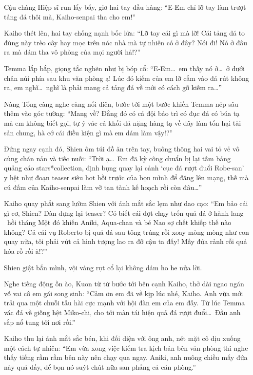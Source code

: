 \documentclass[../main.tex]{subfiles}
\begin{document}
Cậu chàng Hiệp sĩ run lẩy bẩy, giơ hai tay đầu hàng: ``E-Em chỉ lỡ tay làm trượt tảng đá thôi mà, Kaiho-senpai tha cho em!''

Kaiho thét lên, hai tay chống nạnh bốc lửa: ``Lỡ tay cái gì mà lỡ! Cái tảng đá to đùng này trèo cây hay mọc trên nóc nhà mà tự nhiên có ở đây? Nói đi! Nó ở đâu ra mà dám tha vô phòng của mọi người hả!?''

Temma lắp bắp, giọng tắc nghẽn như bị bóp cổ: ``E-Em\dots\ em thấy nó ở\dots\ ở dưới chân núi phía sau khu văn phòng ạ! Lúc đó kiếm của em lỡ cắm vào đá rút không ra, em nghĩ\dots\ nghĩ là phải mang cả tảng đá về mới có cách gỡ kiếm ra\dots''

Nàng Tổng càng nghe càng nổi điên, bước tới một bước khiến Temma nép sâu thêm vào góc tường: ``Mang về? Đằng đó có cả đội bảo trì có đục đá có búa tạ mà em không biết gọi, tự ý vác cả khối đá nặng hàng tạ về đây làm tổn hại tài sản chung, hà cớ cái điều kiện gì mà em dám làm vậy!?''

Đứng ngay cạnh đó, Shien ôm túi đồ ăn trên tay, buông thõng hai vai tỏ vẻ vô cùng chán nản và tiếc nuối: ``Trời ạ\dots\ Em đã kỳ công chuẩn bị lại tấm bảng quảng cáo stars*collection, định bụng quay lại cảnh `cục đá rượt đuổi Robe-san' y hệt như đoạn teaser siêu hot hồi trước của bọn mình để đăng lên mạng, thế mà cú đấm của Kaiho-senpai làm vỡ tan tành kế hoạch rồi còn đâu\dots''

Kaiho quay phắt sang lườm Shien với ánh mắt sắc lẹm như dao cạo: ``Em bảo cái gì cơ, Shien? Dàn dựng lại teaser? Có biết cái đợt chạy trốn quả đá ở hành lang \hll\ hồi tháng Một đó khiến Aniki, Aqua-chan và bé Nao sợ chết khiếp thế nào không? Cả cái vụ Roberto bị quả đá sau tông trúng rồi xoay mòng mòng như con quay nữa, tôi phải vứt cả hình tượng lao ra đỡ cậu ta đấy! Mấy đứa rảnh rỗi quá hóa rồ rồi à!?''

Shien giật bắn mình, vội vàng rụt cổ lại không dám ho he nửa lời.

Nghe tiếng động ồn ào, Kuon từ từ bước tới bên cạnh Kaiho, thở dài ngao ngán vỗ vai cô em gái song sinh: ``Cảm ơn em đã về kịp lúc nhé, Kaiho. Anh vừa mới trải qua một chuỗi tấu hài cực mạnh với hội đàn em của em đấy. Từ lúc Temma vác đá về giống hệt Miko-chi, cho tới màn tái hiện quả đá rượt đuổi\dots\ Đầu anh sắp nổ tung tới nơi rồi.''

Kaiho thu lại ánh mắt sắc bén, khi đối diện với ông anh, nét mặt cô dịu xuống một cách tự nhiên: ``Em vừa xong việc kiểm tra kịch bản bên văn phòng thì nghe thấy tiếng rầm rầm bên này nên chạy qua ngay. Aniki, anh nuông chiều mấy đứa này quá đấy, để bọn nó suýt chút nữa san phẳng cả căn phòng.''
\end{document}
